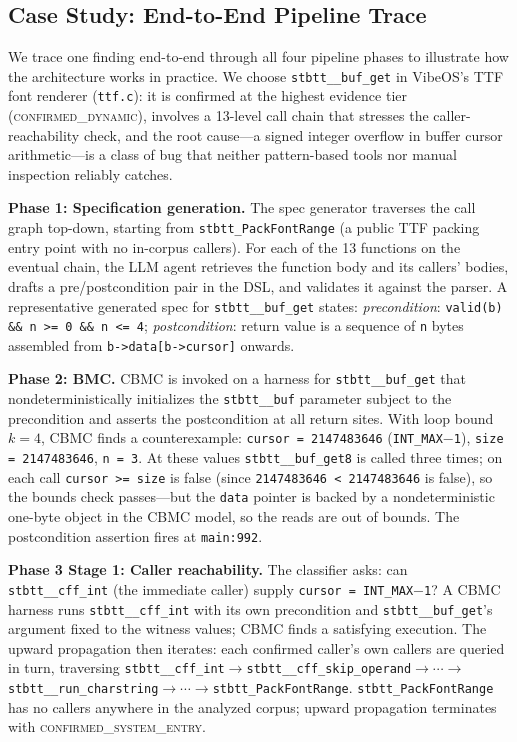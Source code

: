 \documentclass[11pt,a4paper]{article}
\newcommand{\dynconf}{\textsc{confirmed\_dynamic}\xspace}
\newcommand{\sysconf}{\textsc{confirmed\_system\_entry}\xspace}
\begin{document}
\subsection{Case Study: End-to-End Pipeline Trace}
\label{sec:casestudy}

We trace one finding end-to-end through all four pipeline phases to illustrate
how the architecture works in practice. We choose
\texttt{stbtt\_\_buf\_get} in VibeOS's TTF font renderer
(\texttt{ttf.c}): it is confirmed at the highest evidence tier (\dynconf),
involves a 13-level call chain that stresses the caller-reachability check,
and the root cause---a signed integer overflow in buffer cursor arithmetic---is
a class of bug that neither pattern-based tools nor manual inspection reliably
catches.

\smallskip\noindent\textbf{Phase 1: Specification generation.}
The spec generator traverses the call graph top-down, starting from
\texttt{stbtt\_PackFontRange} (a public TTF packing entry point with no
in-corpus callers). For each of the 13 functions on the eventual chain, the
LLM agent retrieves the function body and its callers' bodies, drafts a
pre/postcondition pair in the DSL, and validates it against the parser.
A representative generated spec for \texttt{stbtt\_\_buf\_get} states:
\emph{precondition}: \texttt{valid(b) \&\& n >= 0 \&\& n <= 4};
\emph{postcondition}: return value is a sequence of \texttt{n} bytes
assembled from \texttt{b->data[b->cursor]} onwards.

\smallskip\noindent\textbf{Phase 2: BMC.}
CBMC is invoked on a harness for \texttt{stbtt\_\_buf\_get} that
nondeterministically initializes the \texttt{stbtt\_\_buf} parameter
subject to the precondition and asserts the postcondition at all return
sites. With loop bound $k=4$, CBMC finds a counterexample:
\texttt{cursor = 2147483646} (\texttt{INT\_MAX$-$1}), \texttt{size = 2147483646},
\texttt{n = 3}. At these values \texttt{stbtt\_\_buf\_get8} is called three
times; on each call \texttt{cursor >= size} is false (since
\texttt{2147483646 < 2147483646} is false), so the bounds check
passes---but the \texttt{data} pointer is backed by a nondeterministic
one-byte object in the CBMC model, so the reads are out of bounds.
The postcondition assertion fires at \texttt{main:992}.

\smallskip\noindent\textbf{Phase 3 Stage 1: Caller reachability.}
The classifier asks: can \texttt{stbtt\_\_cff\_int} (the immediate caller)
supply \texttt{cursor = INT\_MAX$-$1}? A CBMC harness runs
\texttt{stbtt\_\_cff\_int} with its own precondition and \texttt{stbtt\_\_buf\_get}'s
argument fixed to the witness values; CBMC finds a satisfying execution.
The upward propagation then iterates: each confirmed caller's own callers
are queried in turn, traversing
\texttt{stbtt\_\_cff\_int}$\to$\texttt{stbtt\_\_cff\_skip\_operand}$\to\cdots\to$%
\texttt{stbtt\_\_run\_charstring}$\to\cdots\to$\texttt{stbtt\_PackFontRange}.
\texttt{stbtt\_PackFontRange} has no callers anywhere in the analyzed corpus;
upward propagation terminates with \sysconf.
\end{document}
